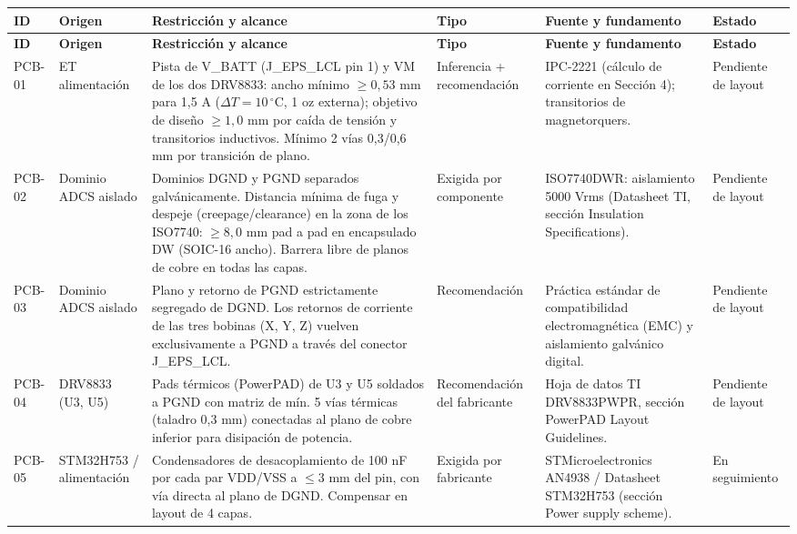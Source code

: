 \tiny
\setlength{\tabcolsep}{2.5pt}
\renewcommand{\arraystretch}{1.15}
\begin{longtable}{|>{\raggedright\arraybackslash}p{1.0cm}|>{\raggedright\arraybackslash}p{1.8cm}|>{\raggedright\arraybackslash}p{5.4cm}|>{\raggedright\arraybackslash}p{1.6cm}|>{\raggedright\arraybackslash}p{4.2cm}|>{\raggedright\arraybackslash}p{1.7cm}|}
\hline
\textbf{ID} & \textbf{Origen} & \textbf{Restricción y alcance} & \textbf{Tipo} & \textbf{Fuente y fundamento} & \textbf{Estado} \\ \hline
\endfirsthead
\hline
\textbf{ID} & \textbf{Origen} & \textbf{Restricción y alcance} & \textbf{Tipo} & \textbf{Fuente y fundamento} & \textbf{Estado} \\ \hline
\endhead
PCB-01 & ET alimentación & Pista de V\_BATT (J\_EPS\_LCL pin 1) y VM de los dos DRV8833: ancho mínimo $\ge 0,53$ mm para 1,5 A ($\Delta T = 10\,^{\circ}\text{C}$, 1 oz externa); objetivo de diseño $\ge 1,0$ mm por caída de tensión y transitorios inductivos. Mínimo 2 vías 0,3/0,6 mm por transición de plano. & Inferencia + recomendación & IPC-2221 (cálculo de corriente en Sección 4); transitorios de magnetorquers. & Pendiente de layout \\ \hline
PCB-02 & Dominio ADCS aislado & Dominios DGND y PGND separados galvánicamente. Distancia mínima de fuga y despeje (creepage/clearance) en la zona de los ISO7740: $\ge 8,0$ mm pad a pad en encapsulado DW (SOIC-16 ancho). Barrera libre de planos de cobre en todas las capas. & Exigida por componente & ISO7740DWR: aislamiento 5000 Vrms (Datasheet TI, sección Insulation Specifications). & Pendiente de layout \\ \hline
PCB-03 & Dominio ADCS aislado & Plano y retorno de PGND estrictamente segregado de DGND. Los retornos de corriente de las tres bobinas (X, Y, Z) vuelven exclusivamente a PGND a través del conector J\_EPS\_LCL. & Recomendación & Práctica estándar de compatibilidad electromagnética (EMC) y aislamiento galvánico digital. & Pendiente de layout \\ \hline
PCB-04 & DRV8833 (U3, U5) & Pads térmicos (PowerPAD) de U3 y U5 soldados a PGND con matriz de mín. 5 vías térmicas (taladro 0,3 mm) conectadas al plano de cobre inferior para disipación de potencia. & Recomendación del fabricante & Hoja de datos TI DRV8833PWPR, sección PowerPAD Layout Guidelines. & Pendiente de layout \\ \hline
PCB-05 & STM32H753 / alimentación & Condensadores de desacoplamiento de 100 nF por cada par VDD/VSS a $\le 3$ mm del pin, con vía directa al plano de DGND. Compensar en layout de 4 capas. & Exigida por fabricante & STMicroelectronics AN4938 / Datasheet STM32H753 (sección Power supply scheme). & En seguimiento \\ \hline

\end{longtable}
